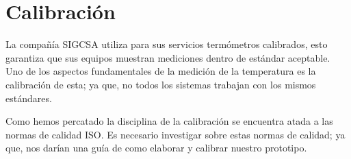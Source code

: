 \section{Calibración}

\par
La compañía SIGCSA utiliza para sus servicios termómetros calibrados, esto garantiza que sus equipos muestran mediciones dentro de estándar aceptable. Uno de los aspectos fundamentales de la medición de la temperatura es la calibración de esta; ya que, no todos los sistemas trabajan con los mismos estándares. 





\par \noindent
Como hemos percatado la disciplina de la calibración se encuentra atada a las normas de calidad ISO. Es necesario investigar sobre estas normas de calidad; ya que, nos darían una guía de como elaborar y calibrar nuestro prototipo.
